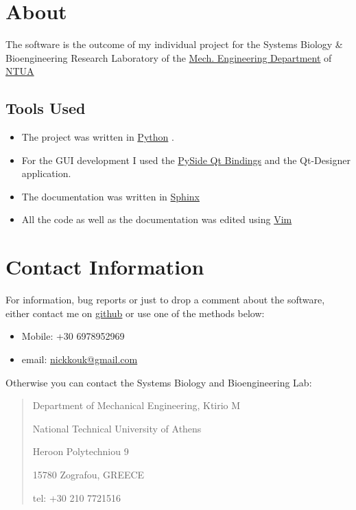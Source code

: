 \documentclass[letterpaper,10pt,english]{sphinxmanual}
\begin{document}
\section{About}
\label{about:about}\label{about::doc}
The software is the outcome of my individual project for the Systems Biology \&
Bioengineering Research Laboratory of the \href{http://www.mech.ntua.gr/en/home}{Mech. Engineering Department} of \href{http://www.ntua.gr/index\_en.html}{NTUA}


\subsection{Tools Used}
\label{about:tools-used}\begin{itemize}
\item {} 
The project was written in \href{http://www.python.org}{Python} .

\item {} 
For the GUI development I used the \href{http://qt-project.org/wiki/pyside}{PySide Qt Bindings} and the Qt-Designer application.

\item {} 
The documentation was written in \href{http://sphinx-doc.org/}{Sphinx}

\item {} 
All the code as well as the documentation was edited using \href{http://www.vim.org/}{Vim}

\end{itemize}


\section{Contact Information}
\label{contact-info::doc}\label{contact-info:contact-information}
For information, bug reports or just to drop a comment about the software,
either contact me on \href{https://github.com/bergercookie}{github}
or use one of the methods below:
\begin{itemize}
\item {} 
Mobile: +30 6978952969

\item {} 
email: \href{mailto:nickkouk@gmail.com}{nickkouk@gmail.com}

\end{itemize}

Otherwise you can contact the Systems Biology and Bioengineering Lab:
\begin{quote}

\begin{DUlineblock}{0em}
\item[] Department of Mechanical Engineering, Ktirio M
\item[] National Technical University of Athens
\item[] Heroon Polytechniou 9
\item[] 15780 Zografou, GREECE
\item[] tel: +30 210 7721516
\end{DUlineblock}
\end{quote}
\end{document}
